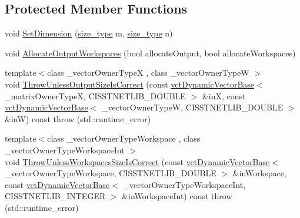 \subsection*{Protected Member Functions}
\begin{DoxyCompactItemize}
\item 
void \hyperlink{classnmr_n_n_l_s_dynamic_data_a0f066c5d2f1e0e4ce62e6a3939f717fa}{Set\+Dimension} (\hyperlink{classnmr_n_n_l_s_dynamic_data_aff3aaadfea66b14eac2e3e022e41b35b}{size\+\_\+type} m, \hyperlink{classnmr_n_n_l_s_dynamic_data_aff3aaadfea66b14eac2e3e022e41b35b}{size\+\_\+type} n)
\item 
void \hyperlink{classnmr_n_n_l_s_dynamic_data_ad8f5bb3b4bf519c90c0de301ebb4446c}{Allocate\+Output\+Workspaces} (bool allocate\+Output, bool allocate\+Workspaces)
\item 
{\footnotesize template$<$class \+\_\+vector\+Owner\+Type\+X , class \+\_\+vector\+Owner\+Type\+W $>$ }\\void \hyperlink{classnmr_n_n_l_s_dynamic_data_a9afd52addff4968713a7bef19c3d2ee9}{Throw\+Unless\+Output\+Size\+Is\+Correct} (const \hyperlink{classvct_dynamic_vector_base}{vct\+Dynamic\+Vector\+Base}$<$ \+\_\+matrix\+Owner\+Type\+X, C\+I\+S\+S\+T\+N\+E\+T\+L\+I\+B\+\_\+\+D\+O\+U\+B\+L\+E $>$ \&in\+X, const \hyperlink{classvct_dynamic_vector_base}{vct\+Dynamic\+Vector\+Base}$<$ \+\_\+vector\+Owner\+Type\+W, C\+I\+S\+S\+T\+N\+E\+T\+L\+I\+B\+\_\+\+D\+O\+U\+B\+L\+E $>$ \&in\+W) const   throw (std\+::runtime\+\_\+error)
\item 
{\footnotesize template$<$class \+\_\+vector\+Owner\+Type\+Workspace , class \+\_\+vector\+Owner\+Type\+Workspace\+Int $>$ }\\void \hyperlink{classnmr_n_n_l_s_dynamic_data_af7cbdc8ad11b1f78d967b259ca45e2b3}{Throw\+Unless\+Workspaces\+Size\+Is\+Correct} (const \hyperlink{classvct_dynamic_vector_base}{vct\+Dynamic\+Vector\+Base}$<$ \+\_\+vector\+Owner\+Type\+Workspace, C\+I\+S\+S\+T\+N\+E\+T\+L\+I\+B\+\_\+\+D\+O\+U\+B\+L\+E $>$ \&in\+Workspace, const \hyperlink{classvct_dynamic_vector_base}{vct\+Dynamic\+Vector\+Base}$<$ \+\_\+vector\+Owner\+Type\+Workspace\+Int, C\+I\+S\+S\+T\+N\+E\+T\+L\+I\+B\+\_\+\+I\+N\+T\+E\+G\+E\+R $>$ \&in\+Workspace\+Int) const   throw (std\+::runtime\+\_\+error)
\end{DoxyCompactItemize}
